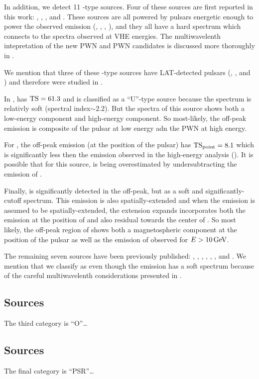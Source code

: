 In addition, we detect 11 \PWNcClass-type sources.  Four of these sources
are first reported in this work: , , ,
and .  These sources are all powered by pulsars energetic
enough to power the observed emission (, ,
, ), and they all have a hard spectrum which
connects to the spectra observed at \ac{VHE} energies.  The multiwavelenth
intepretation of the new \ac{PWN} and \ac{PWN} candidates is discussed
more thoroughly in \cite{acero_2013a_constraints-galactic}.


We mention that three of these \PWNcClass-type sources have LAT-detected
pulsars (, , and ) and therefore were
studied in .

In ,  has $\mathrm{TS}=61.3$ and is classified as
a ``U''-type source because the spectrum is relativly soft (spectral
index$\sim2.2$).  But the spectra of this source shows both a low-energy
component and high-energy component.  So most-likely, the off-peak
emission is composite of the pulsar at low energy adn the \ac{PWN}
at high energy.

For , the off-peak emission (at the position of the pulsar)
has $\mathrm{TS}_\mathrm{point}=8.1$ which is significantly less then the emission observed
in the high-energy analysis ().  It is possible that for this
source, \tstev is being overestimated by undersubtracting the emission
of .

Finally,  is significantly detected in the off-peak,
but as a soft and significantly-cutoff spectrum. This emission
is also spatially-extended and when the emission is assumed to be
spatially-extended, the extension expands incorporates both the emission
at the position of  and also residual towards the center of
. So most likely, the off-peak region of  shows
both a magnetospheric component at the position of the pulsar as well
as the emission of  observed for $E>10\,\text{GeV}$.

The remaining seven sources have been previously published:
 \citep{ackermann_2011a_fermi-lat-search},
 \citep{slane_2010a_fermi-detection}, 
\citep{lande_2012_search-spatially}, 
\citep{lande_2012_search-spatially}, 
\citep{lande_2012_search-spatially}, 
\citep{tam_2010a_search-counterparts}, and 
\citep{rousseau_2012a_fermi-lat-constraints}.  We mention that we
classify  as \PWNcClass even though the \gev emission has
a soft spectrum because of the careful multiwavelenth considerations
presented in \cite{lemoine-goumard_2011a_fermi-lat-detection}.

\subsection{\OtherClass Sources}

The third category is ``O''\ldots

\subsection{\PSRClass Sources}

The final category is ``PSR''\ldots





